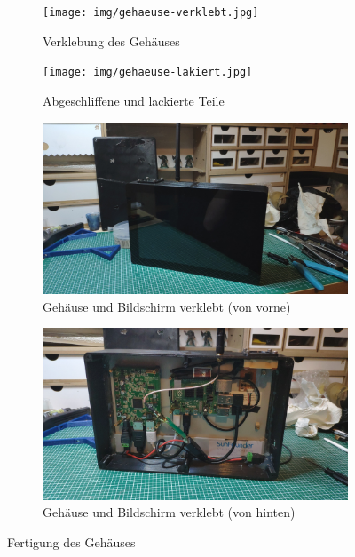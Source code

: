 \begin{figure}[H]
	\begin{subfigure}[b]{0.5\linewidth}
		\centering
		\texttt{[image: img/gehaeuse-verklebt.jpg]}
		\caption[Verklebung des Gehäuses]{Verklebung des Gehäuses}
		\label{fig:glued_parts}
	\end{subfigure}
	\begin{subfigure}[b]{0.5\linewidth}
		\centering
		\texttt{[image: img/gehaeuse-lakiert.jpg]}
		\caption[Abgeschliffene und lackierte Teile]{Abgeschliffene und lackierte Teile}
		\label{fig:filed_and_painted_parts}
	\end{subfigure}
	\begin{subfigure}[b]{0.5\linewidth}
		\centering
		\includegraphics[width=1\textwidth]{img/geraet_front.jpg}
		\caption[Gehäuse und Bildschirm verklebt (von vorne)]{Gehäuse und Bildschirm verklebt (von vorne)}
		\label{fig:finished_case_front}
	\end{subfigure}
	\begin{subfigure}[b]{0.5\linewidth}
		\centering
		\includegraphics[width=1\textwidth]{img/geraet_rueck.jpg}
		\caption[Gehäuse und Bildschirm verklebt (von hinten)]{Gehäuse und Bildschirm verklebt (von hinten)}
		\label{fig:finished_case_back}
	\end{subfigure}
	\caption[Fertigung des Gehäuses]{Fertigung des Gehäuses}
	\label{fig:creating-case}
\end{figure}\par

